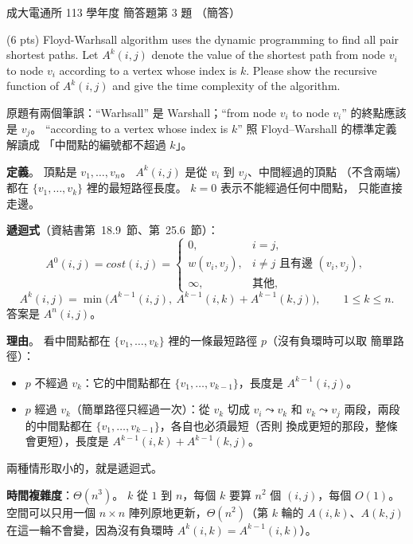 \begin{pastexam}[label={px:ncku-113-cce-12}]{成大電通所 113 學年度 簡答題第 3 題}
（簡答）

(6 pts) Floyd-Warhsall algorithm uses the dynamic programming to find all pair shortest paths.
Let $A^k(i,j)$ denote the value of the shortest path from node $v_i$ to node $v_i$ according to
a vertex whose index is $k$. Please show the recursive function of $A^k(i,j)$ and give the time
complexity of the algorithm.
\end{pastexam}

\begin{pastsoln}
原題有兩個筆誤：``Warhsall'' 是 Warshall；``from node $v_i$ to node $v_i$'' 的終點應該是
$v_j$。 ``according to a vertex whose index is $k$'' 照 Floyd--Warshall 的標準定義解讀成
「中間點的編號都不超過 $k$」。

\textbf{定義}。 頂點是 $v_1, \ldots, v_n$。 $A^k(i, j)$ 是從 $v_i$ 到 $v_j$、中間經過的頂點
（不含兩端）都在 $\{v_1, \ldots, v_k\}$ 裡的最短路徑長度。 $k = 0$ 表示不能經過任何中間點，
只能直接走邊。

\textbf{遞迴式}（資結書第~18.9~節、第~25.6~節）：
\[
A^0(i, j) = \mathit{cost}(i, j) =
\begin{cases}
0, & i = j,\\
w(v_i, v_j), & i \ne j \text{ 且有邊 } (v_i, v_j),\\
\infty, & \text{其他},
\end{cases}
\]
\[
A^k(i, j) = \min\bigl( A^{k-1}(i, j),\ A^{k-1}(i, k) + A^{k-1}(k, j) \bigr),
\qquad 1 \le k \le n .
\]
答案是 $A^n(i, j)$。

\textbf{理由}。 看中間點都在 $\{v_1, \ldots, v_k\}$ 裡的一條最短路徑 $p$（沒有負環時可以取
簡單路徑）：
\begin{itemize}
\item $p$ 不經過 $v_k$：它的中間點都在 $\{v_1, \ldots, v_{k-1}\}$，長度是 $A^{k-1}(i, j)$。
\item $p$ 經過 $v_k$（簡單路徑只經過一次）：從 $v_k$ 切成 $v_i \leadsto v_k$ 和
$v_k \leadsto v_j$ 兩段，兩段的中間點都在 $\{v_1, \ldots, v_{k-1}\}$，各自也必須最短（否則
換成更短的那段，整條會更短），長度是 $A^{k-1}(i, k) + A^{k-1}(k, j)$。
\end{itemize}
兩種情形取小的，就是遞迴式。

\textbf{時間複雜度}：$\Theta(n^3)$。 $k$ 從 $1$ 到 $n$，每個 $k$ 要算 $n^2$ 個 $(i, j)$，每個
$O(1)$。 空間可以只用一個 $n \times n$ 陣列原地更新，$\Theta(n^2)$（第 $k$ 輪的
$A(i, k)$、$A(k, j)$ 在這一輪不會變，因為沒有負環時 $A^k(i, k) = A^{k-1}(i, k)$）。
\end{pastsoln}
